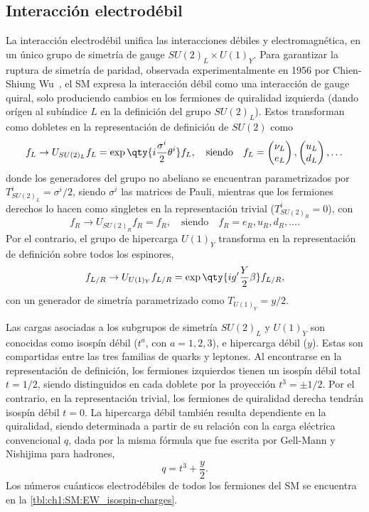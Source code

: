 \subsection{Interacción electrodébil}

La interacción electrodébil unifica las interacciones débiles y electromagnética, en un único grupo de simetría de gauge $SU(2)_L \times U(1)_Y$. Para garantizar la ruptura de simetría de paridad, observada experimentalmente en 1956 por Chien-Shiung Wu~\cite{Wu1957}, el SM expresa la interacción débil como una interacción de gauge quiral, solo produciendo cambios en los fermiones de quiralidad izquierda (dando orígen al subíndice $L$ en la definición del grupo $SU(2)_L$). Estos transforman como dobletes en la representación de definición de $SU(2)$ como
\[
  f_L \to U_{SU(2)_L} f_L = \exp\qty{i \frac{\sigma^i}{2} \theta^i} f_L,
  \quad \text{siendo} \quad
  f_L = \begin{pmatrix} \nu_L \\ e_L \end{pmatrix}, \begin{pmatrix} u_L \\ d_L \end{pmatrix}, \dots
\]
donde los generadores del grupo no abeliano se encuentran parametrizados por $T^i_{SU(2)_L} = \sigma^i/2$, siendo $\sigma^i$ las matrices de Pauli, mientras que los fermiones derechos lo hacen como singletes en la representación trivial ($T^i_{SU(2)_R} = 0$), con 
\[
  f_R \to U_{SU(2)_R} f_R = f_R,
  \quad \text{siendo} \quad
  f_R = e_R, u_R, d_R, \dots.
\]
Por el contrario, el grupo de hipercarga $U(1)_Y$ transforma en la representación de definición sobre todos los espinores, 
\[ f_{L/R} \to U_{U(1)_Y} f_{L/R} = \exp\qty{i g' \frac{Y}{2} \beta} f_{L/R}, \]
con un generador de simetría parametrizado como $T_{U(1)_Y} = y/2$.

Las cargas asociadas a los subgrupos de simetría $SU(2)_L$ y $U(1)_Y$ son conocidas como isospín débil ($t^a$, con $a = 1, 2, 3$), e hipercarga débil ($y$). Estas son compartidas entre las tres familias de quarks y leptones. Al encontrarse en la representación de definición, los fermiones izquierdos tienen un isospín débil total $t = 1/2$, siendo distinguidos en cada doblete por la proyección $t^3 = \pm 1/2$. Por el contrario, en la representación trivial, los fermiones de quiralidad derecha tendrán isospín débil $t = 0$. La hipercarga débil también resulta dependiente en la quiralidad, siendo determinada a partir de su relación con la carga eléctrica convencional $q$, dada por la misma fórmula que fue escrita por Gell-Mann y Nishijima para hadrones,
\begin{equation} q = t^3 + \frac{y}{2}. \label{eq:ch1:SM:Gell-Man_Nishijima} \end{equation}
Los números cuánticos electrodébiles de todos los fermiones del SM se encuentra en la \cref{tbl:ch1:SM:EW_isospin-charges}.

